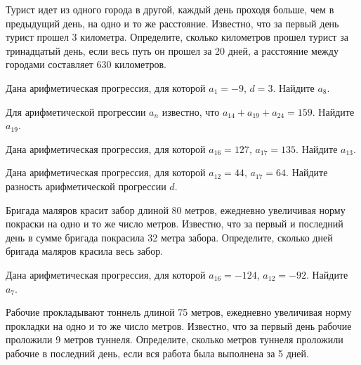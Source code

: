 \documentclass[4apaper]{article}
\begin{document}
\begin{taskBN}{23}
Турист идет из одного города в другой, каждый день проходя больше, чем в предыдущий день, на одно и то же расстояние. Известно, что за первый день турист прошел 3 километра. Определите, сколько километров прошел турист за тринадцатый день, если весь путь он прошел за 20 дней, а расстояние между городами составляет 630 километров.
\end{taskBN}

\begin{taskBN}{24}
Дана арифметическая прогрессия, для которой $a_1 = -9$, $d=3$. Найдите $a_{8}$.
\end{taskBN}

\begin{taskBN}{25}
Для арифметической прогрессии ${a_n}$ известно, что $a_{14} + a_{19} + a_{24}= 159$. Найдите $a_{19}$.
\end{taskBN}

\begin{taskBN}{26}
Дана арифметическая прогрессия, для которой $a_{16} = 127$, $a_{17} = 135$. Найдите $a_{13}$.
\end{taskBN}

\begin{taskBN}{27}
Дана арифметическая прогрессия, для которой $a_{12} = 44$, $a_{17} = 64$. Найдите разность арифметической прогрессии $d$.
\end{taskBN}

\begin{taskBN}{28}
 Бригада маляров красит забор длиной 80 метров, ежедневно увеличивая норму покраски на одно и то же число метров. Известно, что за первый и последний день в сумме бригада покрасила 32 метра забора.  Определите, сколько дней бригада маляров красила весь забор. 
\end{taskBN}

\begin{taskBN}{29}
Дана арифметическая прогрессия, для которой $a_{16} = -124$, $a_{12} = -92$. Найдите $a_{7}$.
\end{taskBN}

\begin{taskBN}{30}
 Рабочие прокладывают тоннель длиной 75 метров, ежедневно увеличивая норму прокладки на одно и то же число метров. Известно, что за первый день рабочие проложили 9 метров туннеля.  Определите, сколько метров туннеля проложили рабочие в последний день, если вся работа была выполнена за 5 дней.
\end{taskBN}
\end{document}
